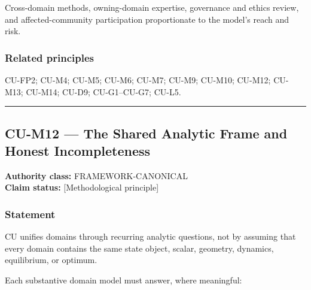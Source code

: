 \documentclass[
  11pt,
]{article}
\begin{document}
Cross-domain methods, owning-domain expertise, governance and ethics
review, and affected-community participation proportionate to the
model's reach and risk.

\subsubsection{Related principles}\label{related-principles-2}

CU-FP2; CU-M4; CU-M5; CU-M6; CU-M7; CU-M9; CU-M10; CU-M12; CU-M13;
CU-M14; CU-D9; CU-G1--CU-G7; CU-L5.

\begin{center}\rule{0.5\linewidth}{0.5pt}\end{center}

\subsection{CU-M12 --- The Shared Analytic Frame and Honest
Incompleteness}\label{cu-m12-the-shared-analytic-frame-and-honest-incompleteness}

\textbf{Authority class:} FRAMEWORK-CANONICAL\\
\textbf{Claim status:} {[}Methodological principle{]}

\subsubsection{Statement}\label{statement-20}

CU unifies domains through recurring analytic questions, not by assuming
that every domain contains the same state object, scalar, geometry,
dynamics, equilibrium, or optimum.

Each substantive domain model must answer, where meaningful:
\end{document}
